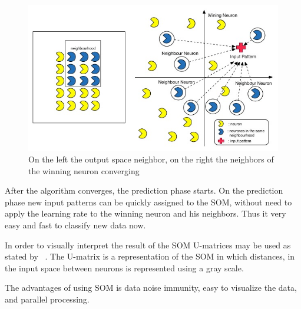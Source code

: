 \begin{figure}
  \begin{center}
    \includegraphics[width=12cm]{images/5_neighbours_converge.jpg}
  \end{center}
  \caption{ On the left the output space neighbor, on the right the neighbors of the winning neuron converging }
  \label{fig:5_neighbours_converge}
\end{figure}

After the algorithm converges, the prediction phase starts. On the prediction phase new input patterns can be quickly assigned to the SOM, without need to apply the learning rate to the winning neuron and his neighbors. Thus it very easy and fast to classify new data now.

In order to visually interpret the result of the SOM U-matrices may be used as stated by ~\citep{Bacao2005}. The U-matrix is a representation of the SOM in which distances, in the input space between neurons is represented using a gray scale.

The advantages of using SOM is data noise immunity, easy to visualize the data, and parallel processing.


